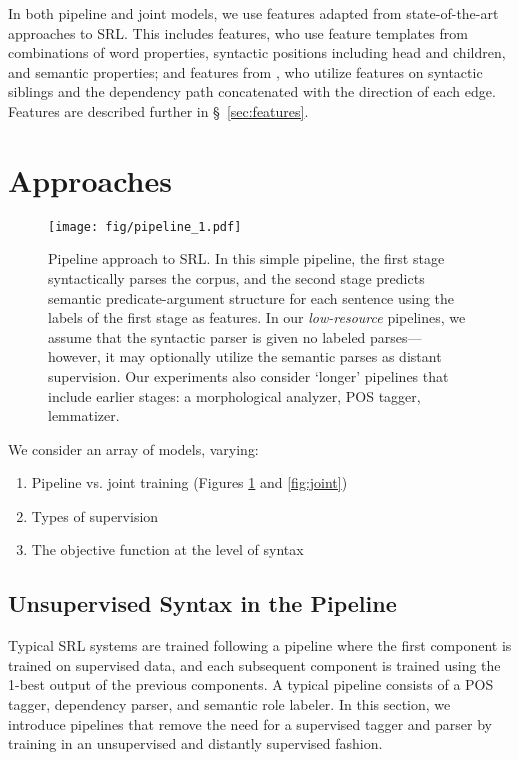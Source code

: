 \documentclass[11pt]{article}
\begin{document}
In both pipeline and joint models, we use features adapted from 
state-of-the-art approaches to SRL.  This includes 
 features, who use feature templates from 
combinations of word
properties, syntactic positions including head and children, and semantic 
properties; and features from , who 
utilize features on 
syntactic siblings and the dependency path concatenated with the 
direction of each edge.  Features are described further in \S~\ref{sec:features}.

\section{Approaches}
\label{sec:approaches}

\begin{figure}
\centering
\texttt{[image: fig/pipeline\_1.pdf]}
\caption{Pipeline approach to SRL. In this simple pipeline, the first
  stage syntactically parses the corpus, and the second stage predicts
  semantic predicate-argument structure for each sentence using
  the labels of the first stage as features. In our
  \emph{low-resource} pipelines, we assume that the syntactic parser
  is given no labeled parses---however, it may optionally utilize the
  semantic parses as distant supervision. Our experiments also consider `longer'
  pipelines that include earlier stages: a morphological analyzer,
  POS tagger, lemmatizer.}\label{fig:pipe}
\end{figure}

We consider an array of models, varying: \vspace{-.5em}

\begin{enumerate}
\itemsep -.25em
\item Pipeline vs. joint training (Figures \ref{fig:pipe} and \ref{fig:joint})
\item Types of supervision
\item The objective function at the level of syntax
\end{enumerate}

\subsection{Unsupervised Syntax in the Pipeline}
\label{sec:pipelineModel}

Typical SRL systems are trained following a pipeline where the first
component is trained on supervised data, and each subsequent component
is trained using the 1-best output of the previous components.  A
typical pipeline consists of a POS tagger, dependency parser, and
semantic role labeler.  In this section, we introduce pipelines that
remove the need for a supervised tagger and parser by training in an
unsupervised and distantly supervised fashion.
\end{document}
